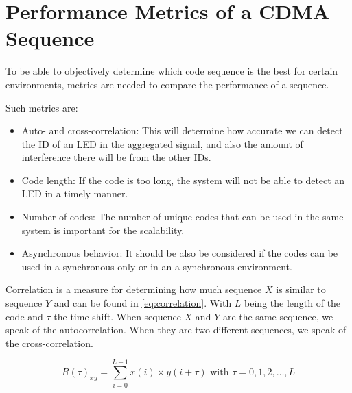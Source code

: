 
\section{Performance Metrics of a CDMA Sequence}
\label{sec:performance-metrics-cdma}

To be able to objectively determine which code sequence is the best for certain environments, metrics are needed to compare the performance of a sequence.


Such metrics are: 

\begin{itemize}

	\item Auto- and cross-correlation: This will determine how accurate we can detect the ID of an LED in the aggregated signal, and also the amount of interference there will be from the other IDs.

	\item Code length: If the code is too long, the system will not be able to detect an LED in a timely manner.

	\item Number of codes: The number of unique codes that can be used in the same system is important for the scalability.

	\item Asynchronous behavior: It should be also be considered if the codes can be used in a synchronous only or in an a-synchronous environment.

\end{itemize}



Correlation is a measure for determining how much sequence $X$ is similar to sequence $Y$ and can be found in \autoref{eq:correlation}.
With $L$ being the length of the code and $\tau$ the time-shift.
When sequence $X$ and $Y$ are the same sequence, we speak of the autocorrelation.
When they are two different sequences, we speak of the cross-correlation. 

\begin{equation}
	R(\tau)_{xy} = \displaystyle\sum_{i = 0} ^ {L - 1} x(i) \times y(i + \tau) {\text{  with $\tau = 0, 1, 2, \dotsc, L$}}
	\label{eq:correlation}
\end{equation}




